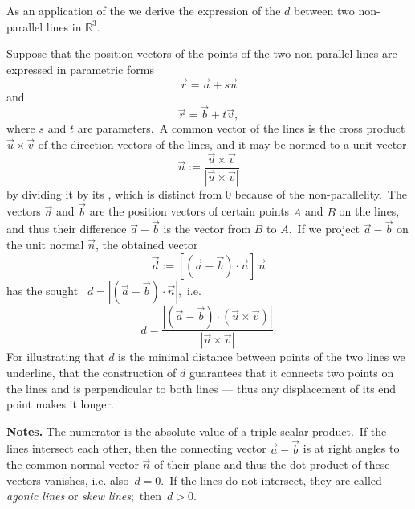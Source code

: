 \documentclass[12pt]{article}
\theoremstyle{definition}
\begin{document}
As an application of the  we derive the expression of the  $d$ between two non-parallel  lines in $\mathbb{R}^3$.

Suppose that the position vectors of the points of the two non-parallel lines are expressed in parametric forms
           $$\vec{r} = \vec{a}\!+\!s\vec{u}$$
and
           $$\vec{r} = \vec{b}\!+\!t\vec{v},$$
where $s$ and $t$ are parameters.\, A common  vector of the lines is the cross product $\vec{u}\times\vec{v}$ of the direction vectors of the lines, and it may be normed to a unit vector
      $$\vec{n} := \frac{\vec{u}\!\times\!\vec{v}}{|\vec{u}\!\times\!\vec{v}|}$$
by dividing it by its , which is distinct from 0 because of the non-parallelity.\, The vectors $\vec{a}$ and $\vec{b}$ are the position vectors of certain points $A$ and $B$ on the lines, and thus their difference $\vec{a}\!-\!\vec{b}$ is the vector from $B$ to $A$.\, If we project $\vec{a}\!-\!\vec{b}$ on the unit normal $\vec{n}$, the obtained vector
       $$\vec{d} := [(\vec{a}\!-\!\vec{b})\!\cdot\!\vec{n}]\,\vec{n}$$
has the sought \, 
$d = |(\vec{a}\!-\!\vec{b})\!\cdot\!\vec{n}|$,\, i.e.
$$d = \frac{|(\vec{a}\!-\!\vec{b})\cdot(\vec{u}\!\times\!\vec{v})|}{|\vec{u}\!\times\!\vec{v}|}.
$$
For illustrating that $d$ is the minimal distance between points of the two lines we underline, that the construction of $d$ guarantees that it connects two points on the lines and is perpendicular to both lines --- thus any displacement of its end point makes it longer.

\textbf{Notes.}\; The numerator is the absolute value of a triple scalar product.\, If the lines intersect each other, then the connecting vector $\vec{a}\!-\!\vec{b}$ is at right angles to the common normal vector $\vec{n}$ of their plane and thus the dot product of these vectors vanishes, i.e. also\, $d = 0$.\, If the lines do not intersect, they are called {\em agonic lines} or {\em skew lines};\, then\, $d > 0$.
\end{document}

